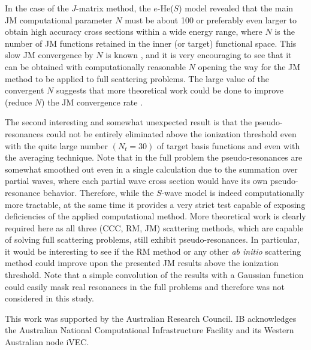 \documentclass[aip
, pra
, showpacs
, aps
, twocolumn
, groupedaddress
, floatfix
]{revtex4}
\begin{document}
In the case of the $J$-matrix method, the $e$-He($S$) model revealed that the main JM computational parameter
$N$ must be about 100 or preferably even larger to obtain high accuracy cross sections within a wide energy range,
where $N$ is the number of JM functions retained in the inner (or target) functional space.
This slow JM convergence by $N$ is known \cite{HY74p1209},
and it is very encouraging to see that it can be obtained with computationally reasonable $N$
opening the way for the JM method to be applied to full scattering problems.
The large value of the convergent $N$ suggests that more theoretical work could be done to
improve (reduce $N$) the JM convergence rate \cite{VBA02p010404}.


The second interesting and somewhat unexpected result is that the pseudo-resonances could not be entirely eliminated
above the ionization threshold even with the quite large number $(N_t=30)$ of target basis functions
and even with the averaging technique.
Note that in the full problem the pseudo-resonances are somewhat smoothed out
even in  a single calculation due to
the summation over partial waves, where each partial wave cross section would have its own pseudo-resonance behavior.
Therefore, while the $S$-wave model is indeed computationally more tractable, at the same time it provides a very strict test
capable of exposing deficiencies of the applied computational method.
More theoretical work is clearly required here as all three (CCC, RM, JM) scattering methods,
which are capable of solving full scattering problems, still exhibit pseudo-resonances.
In particular, it would be interesting to see if the RM method or any other {\em ab initio} scattering method could improve upon the
presented JM results above the ionization threshold.
Note that a simple convolution of the results with a Gaussian function could easily mask real resonances in the full problems
and therefore was not considered in this study.



\begin{acknowledgments}
This work was supported by the Australian Research Council. IB
acknowledges the Australian National Computational Infrastructure
Facility and its Western Australian node iVEC.
\end{acknowledgments}





\end{document}
